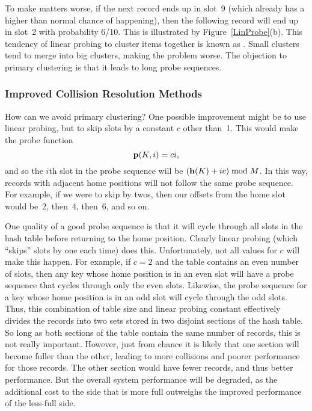 To make matters worse, if the next record ends up in slot~9
(which already has a higher than normal chance of happening),
then the following record will end up in slot~2 with probability
6/10.
This is illustrated by Figure~\ref{LinProbe}(b).
This tendency of linear probing to cluster items together is known as
.
Small clusters tend to merge into big clusters, making the problem
worse.
The objection to primary clustering is that it leads to
long
probe
sequences.

\subsubsection{Improved Collision Resolution Methods}

How
can we avoid primary clustering?
One possible improvement might be to use linear probing, but to skip
slots by a constant \(c\) other than~1.
This would make the probe function
\[ {\bf p}(K, i) = ci,\]
and so the \(i\)th slot in the probe sequence will be
\(({\bf h}(K) + ic) \bmod M\).
In this way, records with adjacent home positions will not follow the
same probe sequence.
For example, if we were to skip by twos, then our offsets from the home
slot would be~2, then~4, then~6, and so on.

One quality of a good probe sequence is that it will cycle through all
slots in the hash table before returning to the home position.
Clearly linear probing (which ``skips'' slots by one each time) does
this.
Unfortunately, not all values for \(c\) will make this
happen.
For example, if \(c = 2\) and the table contains an even number of
slots, then any key whose home position is in an even slot will have
a probe sequence that cycles through only the even slots.
Likewise, the probe sequence for a key whose home position is in an
odd slot will cycle through the odd slots.
Thus, this combination of table size and linear probing constant
effectively divides the records into two sets stored in two
disjoint sections of the hash table.
So long as both sections of the table contain the same number of
records, this is not really important.
However, just from chance it is likely that one section will become
fuller than the other, leading to more collisions and poorer
performance for those records.
The other section would have fewer records, and thus better
performance.
But the overall system performance will be degraded,
as the additional cost to the side that is more full outweighs the
improved performance of the less-full side.

